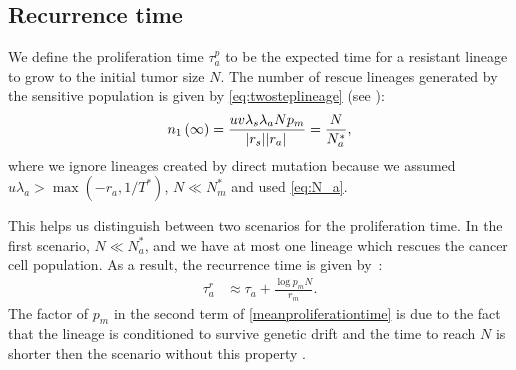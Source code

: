 \documentclass[12pt]{extarticle}
\renewcommand{\Delta}{r}
\begin{document}
\begin{appendices}
\section{Recurrence time}\label{sec:appendix_recurrence_time} %
We define the proliferation time $\tau_a^p$  to be the expected time for a resistant lineage to grow to the initial tumor size $N$.
The number of rescue lineages generated by the sensitive population is given by  \cref{eq:twosteplineage} (see ):
\begin{equation*}
n_1\left(\infty\right)=\frac{uv\lambda_s\lambda_aNp_m}{\abs{\Delta_s}\abs{\Delta_a}}=\frac{N}{N_a^*},
\end{equation*}
where we ignore lineages created by direct mutation because we assumed $u\lambda_a > \max{(-\Delta_a, 1/T^*)}$, $N\ll N_m^*$ and used \cref{eq:N_a}. %

This helps us distinguish between two scenarios for the proliferation time. 
In the first scenario, $N\ll N_a^*$, and we have at most one lineage which rescues the cancer cell population.
As a result, the recurrence time is given by~\citep{avanzini2019cancer}:
\begin{align}\label{meanproliferationtime}
\tau_a^r&\approx\tau_a+\frac{\log p_mN}{\Delta_m}. %
\end{align}
The factor of $p_m$ in the second term of \cref{meanproliferationtime} is due to the fact that the lineage is conditioned to survive genetic drift and the time to reach $N$ is shorter then the scenario without this property \citep{orr2014population,smith1974hitch}. %


\end{appendices}
\end{document}
